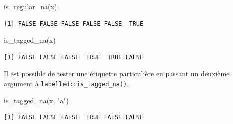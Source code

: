 \documentclass[
  letterpaper,
  DIV=11,
  numbers=noendperiod,
  oneside]{scrreprt}
\newenvironment{Shaded}{\begin{snugshade}}{\end{snugshade}}
\newcommand{\FunctionTok}[1]{\textcolor[rgb]{0.28,0.35,0.67}{#1}}
\newcommand{\NormalTok}[1]{\textcolor[rgb]{0.00,0.23,0.31}{#1}}
\newcommand{\StringTok}[1]{\textcolor[rgb]{0.13,0.47,0.30}{#1}}
\begin{document}
\begin{Shaded}
\begin{Highlighting}[]
\FunctionTok{is\_regular\_na}\NormalTok{(x)}
\end{Highlighting}
\end{Shaded}

\begin{verbatim}
[1] FALSE FALSE FALSE FALSE FALSE  TRUE
\end{verbatim}

\begin{Shaded}
\begin{Highlighting}[]
\FunctionTok{is\_tagged\_na}\NormalTok{(x)}
\end{Highlighting}
\end{Shaded}

\begin{verbatim}
[1] FALSE FALSE FALSE  TRUE  TRUE FALSE
\end{verbatim}

Il est possible de tester une étiquette particulière en passant un
deuxième argument à \texttt{labelled::is\_tagged\_na()}.

\begin{Shaded}
\begin{Highlighting}[]
\FunctionTok{is\_tagged\_na}\NormalTok{(x, }\StringTok{"a"}\NormalTok{)}
\end{Highlighting}
\end{Shaded}

\begin{verbatim}
[1] FALSE FALSE FALSE  TRUE FALSE FALSE
\end{verbatim}
\end{document}
